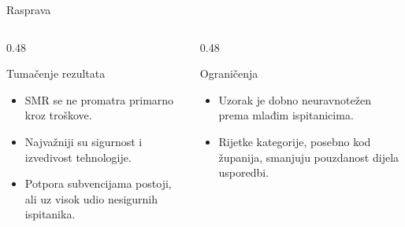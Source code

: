 \documentclass[aspectratio=169]{beamer}
\begin{document}
\begin{frame}{Rasprava}
  \begin{columns}[T]
    \begin{column}{0.48\textwidth}
      \begin{block}{Tumačenje rezultata}
        \begin{itemize}
          \item SMR se ne promatra primarno kroz troškove.
          \item Najvažniji su sigurnost i izvedivost tehnologije.
          \item Potpora subvencijama postoji, ali uz visok udio nesigurnih ispitanika.
        \end{itemize}
      \end{block}
    \end{column}
    \begin{column}{0.48\textwidth}
      \begin{block}{Ograničenja}
        \begin{itemize}
          \item Uzorak je dobno neuravnotežen prema mlađim ispitanicima.
          \item Rijetke kategorije, posebno kod županija, smanjuju pouzdanost dijela usporedbi.
        \end{itemize}
      \end{block}
    \end{column}
  \end{columns}
\end{frame}
\end{document}
